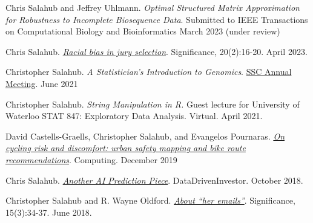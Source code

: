\documentclass[a4paper,11pt]{article}
\newenvironment{compactDesc}
{ \begin{description}
		\setlength{\itemsep}{2pt}
		\setlength{\parskip}{2pt}
		\setlength{\parsep}{1pt}     }
	{ \end{description}                  }
\begin{document}
\vspace{0.2cm}
 \hrulefill

\begin{compactDesc}
	\item 
	Chris Salahub and Jeffrey Uhlmann. \textit{Optimal Structured Matrix Approximation for Robustness to Incomplete Biosequence Data}. Submitted to IEEE Transactions on Computational Biology and Bioinformatics March 2023 (under review)
	\item
	Chris Salahub. \href{https://academic.oup.com/jrssig/article/20/2/16/7095719}{\textit{Racial bias in jury selection}}. Significance, 20(2):16-20. April 2023.
	\item
	Christopher Salahub. \textit{A Statistician's Introduction to Genomics}. \href{https://ssc.ca/en/meetings/past}{SSC Annual Meeting}. June 2021
	\item
	Christopher Salahub. \textit{String Manipulation in R.} Guest lecture for University of Waterloo STAT 847: Exploratory Data Analysis. Virtual. April 2021.
	\item
	David Castells-Graells, Christopher Salahub, and Evangelos Pournaras. \href{https://link.springer.com/article/10.1007\%2Fs00607-019-00771-y}{\textit{On cycling risk and discomfort: urban safety mapping and bike route recommendations}}. Computing. December 2019
	\item
	Chris Salahub. \href{https://medium.com/datadriveninvestor/another-ai-prediction-piece-45f36e6398a}{\textit{Another AI Prediction Piece}}. DataDrivenInvestor. October 2018.
	\item
	Christopher Salahub and R. Wayne Oldford. \href{https://rss.onlinelibrary.wiley.com/doi/full/10.1111/j.1740-9713.2018.01148.x}{\textit{About ``her emails''}}. Significance, 15(3):34-37. June 2018. 
\end{compactDesc}
\end{document}

